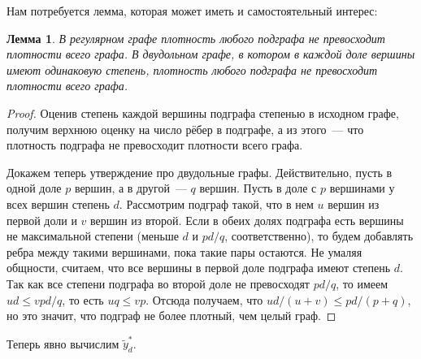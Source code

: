 \documentclass[12pt]{article}
\newtheorem{lemma}{Лемма}
\begin{document}
    Нам потребуется лемма, которая может иметь и самостоятельный интерес:

    \begin{lemma}
        \label{lm:regular}
        В регулярном графе плотность любого подграфа не превосходит плотности всего графа.
        В двудольном графе, в котором в каждой доле вершины имеют одинаковую степень,
        плотность любого подграфа не превосходит плотности всего графа.
    \end{lemma}
    \begin{proof}
        Оценив степень каждой вершины подграфа степенью в исходном графе, получим верхнюю оценку на число рёбер в подграфе, а из этого~---
        что плотность подграфа не превосходит плотности всего графа.
        
        Докажем теперь утверждение про двудольные графы.
        Действительно, пусть в одной доле $p$ вершин, а в другой~--- $q$ вершин. Пусть в доле с $p$ вершинами у всех вершин степень $d$.
        Рассмотрим подграф такой, что в нем $u$ вершин из первой доли и $v$ вершин из второй.
        Если в обеих долях подграфа есть вершины не максимальной степени (меньше $d$ и $pd / q$, соответственно),
        то будем добавлять ребра между такими вершинами, пока такие пары остаются.
        Не умаляя общности, считаем, что все вершины в первой доле подграфа имеют степень $d$.
        Так как все степени подграфа во второй доле не превосходят $pd / q$, то имеем $ud \leq vpd / q$, то есть $uq \leq vp$.
        Отсюда получаем, что $ud / (u + v) \leq pd / (p + q)$, но это значит, что подграф не более плотный, чем целый граф.
    \end{proof}


    Теперь явно вычислим $\tilde{y}_d^*$.
   
\end{document}
